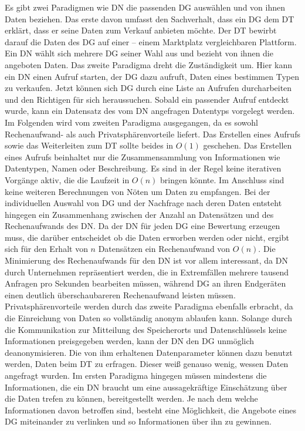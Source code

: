 \documentclass[
	fontsize=11pt,
	headings=small,
	parskip=half,           %
	bibliography=totoc,
	numbers=noenddot,       %
	open=any,               %
]{scrreprt}
\begin{document}
Es gibt zwei Paradigmen wie DN die passenden DG auswählen und von ihnen Daten beziehen. Das erste davon umfasst den Sachverhalt, dass ein DG dem DT erklärt, dass er seine Daten zum Verkauf anbieten möchte. Der DT bewirbt darauf die Daten des DG auf einer -- einem Marktplatz vergleichbaren Plattform. Ein DN wählt sich mehrere DG seiner Wahl aus und bezieht von ihnen die angeboten Daten. Das zweite Paradigma dreht die Zuständigkeit um. Hier kann ein DN einen Aufruf starten, der DG dazu aufruft, Daten eines bestimmen Typen zu verkaufen. Jetzt können sich DG durch eine Liste an Aufrufen durcharbeiten und den Richtigen für sich heraussuchen. Sobald ein passender Aufruf entdeckt wurde, kann ein Datensatz des vom DN angefragen Datentyps vorgelegt werden. \\
Im Folgenden wird vom zweiten Paradigma ausgegangen, da es sowohl Rechenaufwand- als auch Privatsphärenvorteile liefert. Das Erstellen eines Aufrufs sowie das Weiterleiten zum DT sollte beides in $O(1)$ geschehen. Das Erstellen eines Aufrufs beinhaltet nur die Zusammensammlung von Informationen wie Datentypen, Namen oder Beschreibung. Es sind in der Regel keine iterativen Vorgänge aktiv, die die Laufzeit in $O(n)$ bringen könnte. Im Anschluss sind keine weiteren Berechnungen von Nöten um Daten zu empfangen. Bei der individuellen Auswahl von DG und der Nachfrage nach deren Daten entsteht hingegen ein Zusammenhang zwischen der Anzahl an Datensätzen und des Rechenaufwands des DN. Da der DN für jeden DG eine Bewertung erzeugen muss, die darüber entscheidet ob die Daten erworben werden oder nicht, ergibt sich für den Erhalt von $n$ Datensätzen ein Rechenaufwand von $O(n)$. Die Minimierung des Rechenaufwands für den DN ist vor allem interessant, da DN durch Unternehmen repräsentiert werden, die in Extremfällen mehrere tausend Anfragen pro Sekunden bearbeiten müssen, während DG an ihren Endgeräten einen deutlich überschaubareren Rechenaufwand leisten müssen. \\
Privatsphärenvorteile werden durch das zweite Paradigma ebenfalls erbracht, da die Einreichung von Daten so vollständig anonym ablaufen kann. Solange durch die Kommunikation zur Mitteilung des Speicherorts und Datenschlüssels keine Informationen preisgegeben werden, kann der DN den DG unmöglich deanonymisieren. Die von ihm erhaltenen Datenparameter können dazu benutzt werden, Daten beim DT zu erfragen. Dieser weiß genauso wenig, wessen Daten angefragt wurden. Im ersten Paradigma hingegen müssen mindestens die Informationen, die ein DN braucht um eine aussagekräftige Einschätzung über die Daten trefen zu können, bereitgestellt werden. Je nach dem welche Informationen davon betroffen sind, besteht eine Möglichkeit, die Angebote eines DG miteinander zu verlinken und so Informationen über ihn zu gewinnen.
\end{document}
